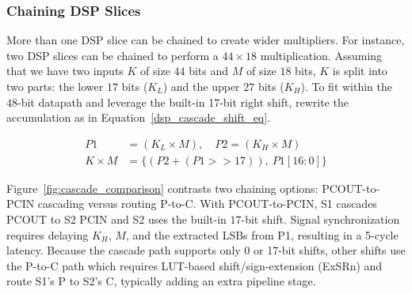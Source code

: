 


\subsubsection{Chaining DSP Slices} \label{sec_dsp_cascade}
More than one DSP slice can be chained to create wider multipliers.
For instance, two DSP slices can be chained to perform a $44\times18$ multiplication.
Assuming that we have two inputs $K$ of size $44$ bits and $M$ of size $18$ bits,
$K$ is split into two parts: the lower $17$ bits ($K_L$) and the upper $27$ bits ($K_H$).
To fit within the $48$-bit datapath and leverage the built-in 17-bit right shift, rewrite the accumulation as in Equation~\ref{dsp_cascade_shift_eq}.

\begin{equation} \label{dsp_cascade_shift_eq}
\begin{split}
    P1 &= (K_L\times M), \quad P2 = (K_H \times M)\\
    K\times M &=  \{(P2 + (P1 >>17)),
            \ P1[16:0]\}
\end{split}
\end{equation}

Figure~\ref{fig:cascade_comparison} contrasts two chaining options: PCOUT-to-PCIN cascading versus routing P-to-C.
With PCOUT-to-PCIN, S1 cascades PCOUT to S2 PCIN and S2 uses the built-in $17$-bit shift.
Signal synchronization requires delaying $K_H$, $M$, and the extracted LSBs from P1, resulting in a 5-cycle latency.
Because the cascade path supports only 0 or 17-bit shifts, other shifts use the P-to-C path which requires LUT-based shift/sign-extension (ExSRn) and route S1's P to S2's C, typically adding an extra pipeline stage.


